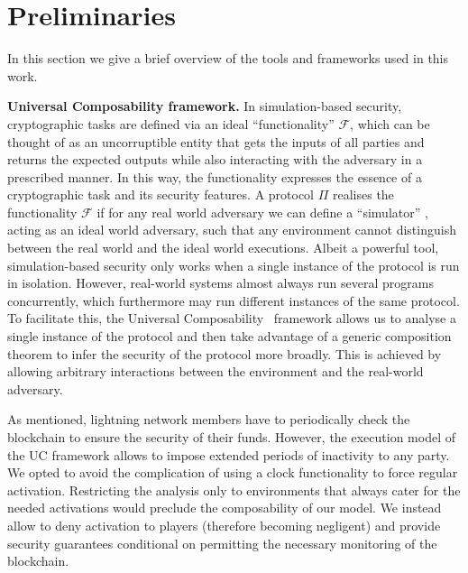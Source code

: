 \section{Preliminaries}
\label{sec:preliminaries}
  In this section we give a brief overview of the tools and frameworks used in
  this work.

  \noindent \textbf{Universal Composability framework.}
    In simulation-based security, cryptographic tasks are defined via an ideal
    ``functionality'' $\mathcal{F}$, which can be thought of as an uncorruptible
    entity that gets the inputs of all parties and returns the expected outputs
    while also interacting with the adversary in a prescribed manner. In this
    way, the functionality expresses the essence of a cryptographic task and its
    security features. A protocol $\Pi$ realises the functionality $\mathcal{F}$
    if for any  real world adversary we can define a ``simulator'' \simulator{},
    acting as an ideal world adversary, such that any environment \environment{}
    cannot distinguish between the real world and the ideal world executions.
    Albeit a powerful tool, simulation-based security only works when a single
    instance of the protocol is run in isolation. However, real-world systems
    almost always run several programs concurrently, which furthermore may run
    different instances of the same protocol. To facilitate this, the Universal
    Composability~\cite{uc} framework allows us to analyse a single instance of
    the protocol and then take advantage of a generic composition theorem to
    infer the security of the protocol more broadly. This is achieved by
    allowing arbitrary interactions between the environment and the real-world
    adversary.

    As mentioned, lightning network members have to periodically check the
    blockchain to ensure the security of their funds. However, the execution
    model of the UC framework allows \environment{} to impose extended periods
    of inactivity to any party. We opted to avoid the complication of using a
    clock functionality to force regular activation. Restricting the analysis
    only to environments that always cater for the needed activations would
    preclude the composability of our model. We instead allow \environment{} to
    deny activation to players (therefore becoming negligent) and provide
    security guarantees conditional on \environment{} permitting the necessary
    monitoring of the blockchain.

